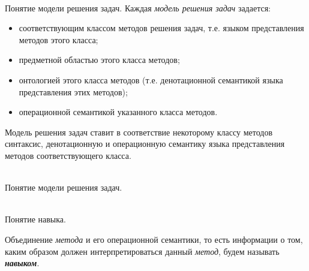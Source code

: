 \begin{frame}{\\Понятие модели решения задач.}
	\topline
	\justifying
    Каждая \textit{модель решения задач} задается:
    \begin{itemize}
    	\item соответствующим классом методов решения задач, т.е. языком представления методов этого класса;
    	\item предметной областью этого класса методов; 
    	\item онтологией этого класса методов (т.е. денотационной семантикой языка представления этих методов);
    	\item операционной семантикой указанного класса методов.
    \end{itemize}
    Модель решения задач ставит в соответствие некоторому классу методов синтаксис, денотационную и операционную семантику языка представления методов соответствующего класса.
\end{frame}

\begin{frame}{\\Понятие модели решения задач.}
	\topline
	\justifying
    \begin{SCn}
    \end{SCn}
\end{frame}

\begin{frame}{\\Понятие навыка.}
	\topline
	\justifying
    \begin{SCn}
    Объединение \textit{метода} и его операционной семантики, то есть информации о том, каким образом должен интерпретироваться данный \textit{метод}, будем называть \textbf{\textit{навыком}}.
    \end{SCn}
\end{frame}

